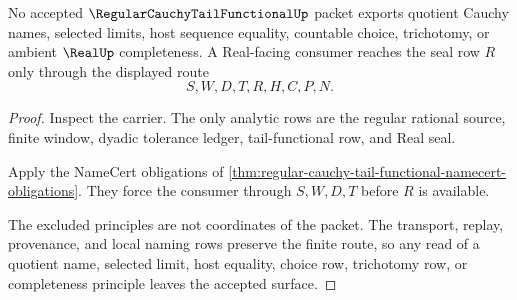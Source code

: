 \begin{theorem}
\label{thm:regular-cauchy-tail-functional-real-seal-nonescape}
No accepted $\RegularCauchyTailFunctionalUp$ packet exports quotient Cauchy names, selected limits, host sequence equality, countable choice, trichotomy, or ambient $\RealUp$ completeness. A Real-facing consumer reaches the seal row $R$ only through the displayed route
$$
S,W,D,T,R,H,C,P,N.
$$
\end{theorem}
\begin{proof}
Inspect the carrier. The only analytic rows are the regular rational source, finite window, dyadic tolerance ledger, tail-functional row, and Real seal.

Apply the NameCert obligations of \autoref{thm:regular-cauchy-tail-functional-namecert-obligations}. They force the consumer through $S,W,D,T$ before $R$ is available.

The excluded principles are not coordinates of the packet. The transport, replay, provenance, and local naming rows preserve the finite route, so any read of a quotient name, selected limit, host equality, choice row, trichotomy row, or completeness principle leaves the accepted surface.
\end{proof}




